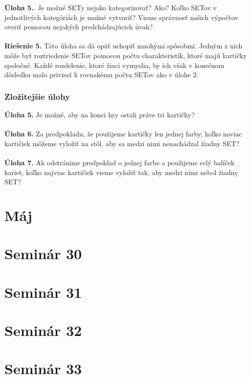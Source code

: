 \documentclass[11pt,a4paper,oneside,final]{book}
\begin{document}
\textbf{Úloha 5.}. Je možné SETy nejako kategorizovať? Ako? Koľko SETov v jednotlivých kategóriách je možné vytvoriť? Vieme správnosť našich výpočtov overiť pomocou nejakých predchádzajúcich úvah?\\
\\
\textbf{Riešenie 5.} Táto úloha sa dá opäť uchopiť mnohými spôsobmi. Jedným z nich môže byť roztriedenie SETov pomocou počtu charakteristík, ktoré majú kartičky spoločné. Každé rozdelenie, ktoré žiaci vymyslia, by ich však v konečnom dôsledku malo priviesť k rovnakému počtu SETov ako v úlohe 2.\\

\subsubsection*{Zložitejšie úlohy}
\textbf{Úloha 5.} Je možné, aby na konci hry ostali práve tri kartičky?\\
\\
\textbf{Úloha 6.} Za predpokladu, že použijeme kartičky len jednej farby, koľko naviac kartičiek môžeme vyložiť na stôl, aby sa medzi nimi nenachádzal žiadny SET?\\
\\
 \textbf{Úloha 7.} Ak odstránime predpoklad o jednej farbe a použijeme celý balíček kariet, koľko najviac kartičiek vieme vyložiť tak, aby medzi nimi nebol žiadny SET?

\newpage
\section{Máj}

\section*{Seminár 30}

\newpage
\section*{Seminár 31}

\newpage
\section*{Seminár 32}

\newpage
\section*{Seminár 33}
\end{document}
